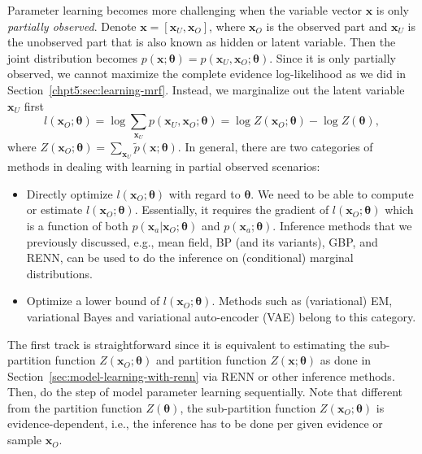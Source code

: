 Parameter learning becomes more challenging when the variable vector $\bm{x}$ is only \textit{partially observed}. Denote $\bm{x} = [\bm{x}_U, \bm{x}_O]$, where $\bm{x}_O$ is the observed part and $\bm{x}_U$ is the unobserved part that is also known as hidden or latent variable. Then the joint distribution becomes $p(\bm{x}; \bm{\theta}) = p(\bm{x}_U, \bm{x}_O; \bm{\theta})$. Since it is only partially observed, we cannot maximize the complete evidence log-likelihood as we did in Section~\ref{chpt5:sec:learning-mrf}. Instead, we marginalize out the latent variable $\bm{x}_U$ first
\begin{equation}\label{chpt5:eq:patial-likelihood}
  l(\bm{x}_O; \bm{\theta}) = \log{\sum_{\bm{x}_U}p(\bm{x}_U, \bm{x}_O; \bm{\theta})} = \log{Z(\bm{x}_O;\bm{\theta})} - \log{Z(\bm{\theta})},
\end{equation}
where $Z(\bm{x}_O;\bm{\theta}) = \sum_{\bm{x}_U}\tilde{p}(\bm{x}; \bm{\theta})$. In general, there are two categories of methods in dealing with learning in partial observed scenarios:
\begin{itemize}
\item Directly optimize $l(\bm{x}_O; \bm{\theta})$ with regard to $\bm{\theta}$. We need to be able to compute or estimate $l(\bm{x}_O; \bm{\theta})$. Essentially, it requires the gradient of $l(\bm{x}_O; \bm{\theta})$ which is a function of both $p(\bm{x}_a| \bm{x}_O; \bm{\theta})$ and $p(\bm{x}_a; \bm{\theta})$. Inference methods that we previously discussed, e.g., mean field, BP (and its variants), GBP, and RENN, can be used to do the inference on (conditional) marginal distributions.
\item Optimize a lower bound of $l(\bm{x}_O; \bm{\theta})$. Methods such as (variational) EM, variational Bayes and variational auto-encoder (VAE) \cite{kingma2019vae} belong to this category.
\end{itemize}

The first track is straightforward since it is equivalent to estimating the sub-partition function $Z(\bm{x}_O; \bm{\theta})$ and partition function $Z(\bm{x}; \bm{\theta})$ as done in Section~\ref{sec:model-learning-with-renn} via RENN or other inference methods. Then, do the step of model parameter learning sequentially. Note that different from the partition function $Z(\bm{\theta})$, the sub-partition function $Z(\bm{x}_O; \bm{\theta})$ is evidence-dependent, i.e., the inference has to be done per given evidence or sample  $\bm{x}_O$. 


